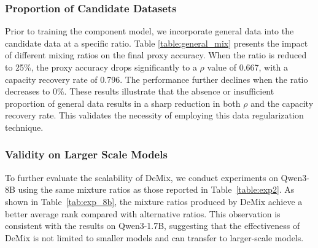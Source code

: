 \documentclass{article}
\theoremstyle{plain}
\theoremstyle{definition}
\theoremstyle{remark}
\newcommand{\comments}[1]{\textcolor{red}{#1}}
\begin{document}
\begin{table}[t]
  \caption{Comparison of performances with different proportion of mixed general data in candidate dataset.}
  \label{table:general_mix}
  \begin{center}
  \end{center}
\end{table}


\subsubsection{Proportion of Candidate Datasets}
Prior to training the component model, we incorporate general data into the candidate data at a specific ratio. Table \ref{table:general_mix} presents the impact of different mixing ratios on the final proxy accuracy. When the ratio is reduced to 25\%, the proxy accuracy drops significantly to a $\rho$ value of 0.667, with a capacity recovery rate of 0.796. The performance further declines when the ratio decreases to 0\%. These results illustrate that the absence or insufficient proportion of general data results in a sharp reduction in both $\rho$ and the capacity recovery rate. This validates the necessity of employing this data regularization technique. %

\subsubsection{Validity on Larger Scale Models}


To further evaluate the scalability of DeMix, we conduct experiments on Qwen3-8B using the same mixture ratios as those reported in Table~\ref{table:exp2}. As shown in Table~\ref{tab:exp_8b}, the mixture ratios produced by DeMix achieve a better average rank compared with alternative ratios. This observation is consistent with the results on Qwen3-1.7B, suggesting that the effectiveness of DeMix is not limited to smaller models and can transfer to larger-scale models.
\end{document}
